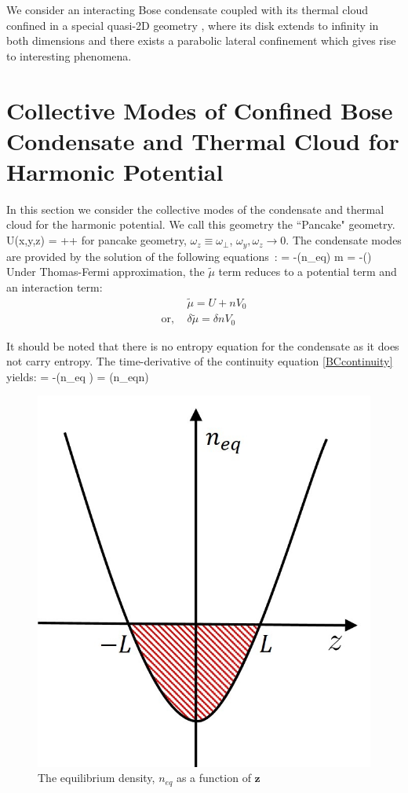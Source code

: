 
\label{sec:Bose}
We consider an interacting Bose condensate coupled with its thermal cloud confined in a special quasi-2D geometry , where its disk extends to infinity in both dimensions and there exists a parabolic lateral confinement which gives rise to interesting phenomena.

\section{Collective Modes of Confined Bose Condensate and Thermal Cloud for Harmonic Potential}
In this section we consider the collective modes of the condensate and thermal cloud for the harmonic potential. We call this geometry the ``Pancake" geometry.
\be
U(x,y,z) = ++
\ee
for pancake geometry, $\omega_z\equiv\omega_\perp$, $\omega_y,\omega_z\rightarrow 0$. The condensate modes are provided by the solution of the following equations~\cite{Pethic}:
\be\label{BCcontinuity}
 = -\bm{\nabla}\cdot\left(n_{eq}\right)
\ee
\be\label{BCEuler}
m = -\bm{\nabla}\left(\delta \tilde{\mu}\right) 
\ee
Under Thomas-Fermi approximation, the $\tilde{\mu}$ term reduces to a potential term and an interaction term:
\begin{align}
&\tilde{\mu} = U + nV_0 \\
\mathrm{or,} \ &\delta \tilde{\mu} = \delta nV_0
\end{align}

It should be noted that there is no entropy equation for the condensate as it does not carry entropy. The time-derivative of the continuity equation \eqref{BCcontinuity} yields:
\be
{} = -\bm{\nabla}\cdot\left(n_{eq} \right) = \bm{\nabla}\cdot\left(n_{eq}\bm{\nabla}\delta n\right)
\ee
\begin{figure}[h]
\begin{center}
\includegraphics[height=0.5\columnwidth]{BC1.jpg}
\caption{The equilibrium density, $n_{eq}$ as a function of $\bm{z}$}
\label{fig:BC1}
\end{center}
\end{figure}

